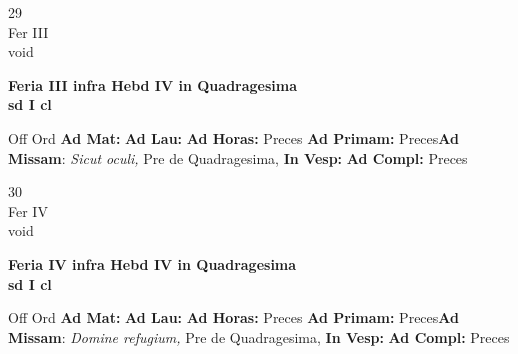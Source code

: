\documentclass[10pt, openany]{book}
\begin{document}
    \begin{center}
        \begin{minipage}{3.5in}
            \vspace{2em}
            \begin{minipage}{0.5in}
                {\Huge 29} \\
                {\normalsize Fer III} \\
                {\normalsize void}
            \end{minipage}
            \begin{minipage}{3.0in}
                \textbf{ \large Feria III infra Hebd IV in Quadragesima  \\
                \textnormal{\normalsize sd I cl}} \\ 
            \end{minipage}
            \begin{justify}Off Ord
                \textbf{Ad Mat: }
                \textbf{Ad Lau: }
                \textbf{Ad Horas: }Preces
                \textbf{Ad Primam: }Preces\textbf{Ad Missam}: \textit{Sicut oculi,} Pre de Quadragesima,  
                \textbf{In Vesp: }
                \textbf{Ad Compl: }Preces
            \end{justify}
        \end{minipage}
    \end{center}

    \begin{center}
        \begin{minipage}{3.5in}
            \vspace{2em}
            \begin{minipage}{0.5in}
                {\Huge 30} \\
                {\normalsize Fer IV} \\
                {\normalsize void}
            \end{minipage}
            \begin{minipage}{3.0in}
                \textbf{ \large Feria IV infra Hebd IV in Quadragesima  \\
                \textnormal{\normalsize sd I cl}} \\ 
            \end{minipage}
            \begin{justify}Off Ord
                \textbf{Ad Mat: }
                \textbf{Ad Lau: }
                \textbf{Ad Horas: }Preces
                \textbf{Ad Primam: }Preces\textbf{Ad Missam}: \textit{Domine refugium,} Pre de Quadragesima,  
                \textbf{In Vesp: }
                \textbf{Ad Compl: }Preces
            \end{justify}
        \end{minipage}
    \end{center}
\end{document}
